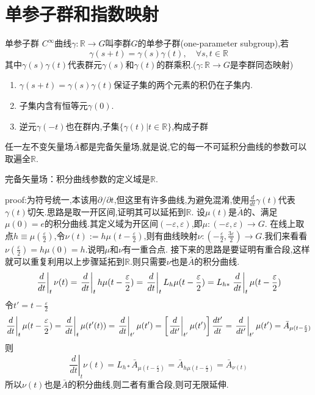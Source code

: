 \documentclass[../main.tex]{subfiles}
\begin{document}
 \chapter{单参子群和指数映射}
 \begin{definition}{}{单参子群}
      $C^\infty$曲线$\gamma : \mathbb{R} \rightarrow G$叫李群$G$的单参子群(one-parameter subgroup),若
     $$ \gamma(s+t) = \gamma(s)\gamma(t),\quad \forall s,t \in \mathbb{R} $$
 其中$\gamma(s)\gamma(t)$代表群元$\gamma(s)$和$\gamma(t)$的群乘积.($\gamma:\mathbb{R}\rightarrow G$是李群同态映射)
 \end{definition}
 \begin{enumerate}
     \item $\gamma(s+t)=\gamma(s)\gamma(t)$保证子集的两个元素的积仍在子集内.
     \item 子集内含有恒等元$\gamma(0)$.
     \item 逆元$\gamma(-t)$也在群内,子集$\{\gamma(t)|t\in \mathbb{R}\}$,构成子群
 \end{enumerate}
 \begin{theorem}
     任一左不变矢量场$\bar{A}$都是完备矢量场,就是说,它的每一不可延积分曲线的参数可以取遍全$\mathbb{R}$.
 \end{theorem}
 \begin{note}
     完备矢量场：积分曲线参数的定义域是$\mathbb{R}$.
 \end{note}
 proof:为符号统一,本该用$\partial/\partial t$,但这里有许多曲线,为避免混淆,使用$\frac{d}{dt}\gamma(t)$代表$\gamma(t)$切矢.思路是取一开区间,证明其可以延拓到$\mathbb{R}$.
 设$\mu(t)$是$\bar{A}$的、满足$\mu(0)=e$的积分曲线.其定义域为开区间$(-\varepsilon,\varepsilon)$,即$\mu:(-\varepsilon,\varepsilon)\rightarrow G$.
 在线上取点$h\equiv \mu(\frac{\varepsilon}{2})$,令$\nu(t):= h\mu(t - \frac{\varepsilon}{2})$,则有曲线映射$\nu:(-\frac{\varepsilon}{2},\frac{3\varepsilon}{2}) \rightarrow G$.我们来看看$\nu(\frac{\varepsilon}{2}) = h \mu(0) = h$.说明$\mu$和$\nu$有一重合点.
 接下来的思路是要证明有重合段,这样就可以重复利用以上步骤延拓到$\mathbb{R}$.则只需要$\nu$也是$\bar{A}$的积分曲线.
     $$ \left.\frac{d}{dt}\right|_{t}\nu(t) = \left.\frac{d}{dt}\right|_{t}h\mu(t - \frac{\varepsilon}{2}) =\left.\frac{d}{dt}\right|_tL_h\mu(t-\frac{\varepsilon}{2}) \\= L_{h*}\left.\frac{d}{dt}\right|_t\mu(t-\frac{\varepsilon}{2}) $$
 令$t' = t-\frac{\varepsilon}{2}$
     $$ \left.\frac{d}{dt}\right|_t\mu(t-\frac{\varepsilon}{2}) = \left.\frac{d}{dt}\right|_t\mu(t'(t)) = \left.\frac{d}{dt}\right|_{t'}\mu(t') \\=\left[\left.\frac{d}{dt'}\right|_{t'}\mu(t')\right] \frac{dt'}{dt} = \left.\frac{d}{dt'}\right|_{t'}\mu(t') = \bar{A}_{\mu(t - \frac{\varepsilon}{2})_{}} $$ 则
     $$ \left.\frac{d}{dt}\right|_{t}\nu(t) = L_{h*} \bar{A}_{\mu(t - \frac{\varepsilon}{2})_{}} = \bar{A}_{h\mu(t - \frac{\varepsilon}{2})} = \bar{A}_{\nu(t)} $$
 所以$\nu(t)$也是$\bar{A}$的积分曲线,则二者有重合段,则可无限延伸.
\end{document}
